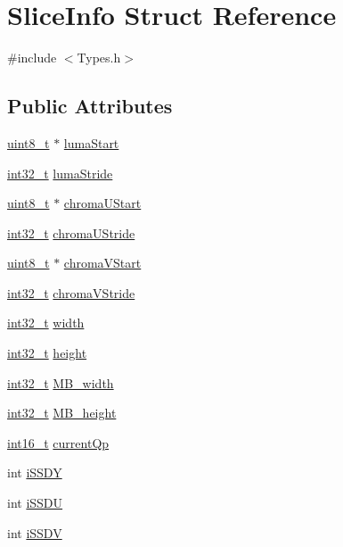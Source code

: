 \hypertarget{struct_slice_info}{
\section{SliceInfo Struct Reference}
\label{struct_slice_info}
}


{\ttfamily \#include $<$Types.h$>$}

\subsection*{Public Attributes}
\begin{DoxyCompactItemize}
\item 
\hyperlink{_types_8h_a363e4d606232036a6b89060813c45489}{uint8\_\-t} $\ast$ \hyperlink{struct_slice_info_a198bba28ea6d348fc54ca0ed8d94896e}{lumaStart}
\item 
\hyperlink{_types_8h_a115ba3a1b24a8702355c5dbd61ce01e0}{int32\_\-t} \hyperlink{struct_slice_info_a59f3f9af4b4127485b3ea3fc79e0d968}{lumaStride}
\item 
\hyperlink{_types_8h_a363e4d606232036a6b89060813c45489}{uint8\_\-t} $\ast$ \hyperlink{struct_slice_info_af7fed88b468688e22348e78896516fe0}{chromaUStart}
\item 
\hyperlink{_types_8h_a115ba3a1b24a8702355c5dbd61ce01e0}{int32\_\-t} \hyperlink{struct_slice_info_add4ff10c8027be3c700e5ee78d7b6a25}{chromaUStride}
\item 
\hyperlink{_types_8h_a363e4d606232036a6b89060813c45489}{uint8\_\-t} $\ast$ \hyperlink{struct_slice_info_a8938e41b2640816d38facbece73e2bf5}{chromaVStart}
\item 
\hyperlink{_types_8h_a115ba3a1b24a8702355c5dbd61ce01e0}{int32\_\-t} \hyperlink{struct_slice_info_a4a2fc013181cb2501d38151cbd20bd5c}{chromaVStride}
\item 
\hyperlink{_types_8h_a115ba3a1b24a8702355c5dbd61ce01e0}{int32\_\-t} \hyperlink{struct_slice_info_ac8546df1212147ac6843f4ee90150a42}{width}
\item 
\hyperlink{_types_8h_a115ba3a1b24a8702355c5dbd61ce01e0}{int32\_\-t} \hyperlink{struct_slice_info_a4f71157b3e8932b647c8d72ccc89d34c}{height}
\item 
\hyperlink{_types_8h_a115ba3a1b24a8702355c5dbd61ce01e0}{int32\_\-t} \hyperlink{struct_slice_info_aaa2d842c5178a57edc75a4830eeaa08a}{MB\_\-width}
\item 
\hyperlink{_types_8h_a115ba3a1b24a8702355c5dbd61ce01e0}{int32\_\-t} \hyperlink{struct_slice_info_ad1009bbd0e253ed3320cb701ea06ce34}{MB\_\-height}
\item 
\hyperlink{_types_8h_ae615613535a2b2445773922f5d45a861}{int16\_\-t} \hyperlink{struct_slice_info_aba609ae5413fe55caccca867397da19f}{currentQp}
\item 
int \hyperlink{struct_slice_info_adfb9e31e55a044441ffd954ad42d2c32}{iSSDY}
\item 
int \hyperlink{struct_slice_info_ad07c205e9d80058c81f4c026b233b877}{iSSDU}
\item 
int \hyperlink{struct_slice_info_ac6803dfcfc27037b3e3857afcbc53e71}{iSSDV}
\end{DoxyCompactItemize}


